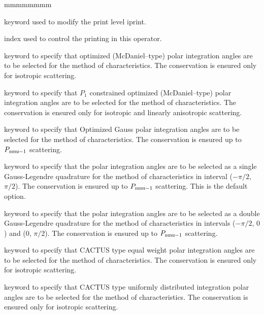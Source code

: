 \begin{ListeDeDescription}{mmmmmmmm}

\item[\moc{EDIT}] keyword used to modify the print level iprint.

\item[\dusa{iprint}] index used to control the printing in this operator.

\item[\moc{LCMD}] keyword to specify that optimized (McDaniel--type) polar integration angles are to be
selected for the method of characteristics.\cite{LCMD} The conservation is ensured only for isotropic scattering.

\item[\moc{OPP1}] keyword to specify that $P_1$ constrained optimized (McDaniel--type) polar integration angles are to be selected for the method of characteristics.\cite{LeTellierpa} The conservation is ensured only for isotropic and linearly anisotropic scattering.

\item[\moc{OGAU}] keyword to specify that Optimized Gauss polar integration angles are to be
selected for the method of characteristics.\cite{LCMD,LeTellierpa} The conservation is ensured up to $P_{\dusa{nmu}-1}$ scattering.

\item[\moc{GAUS}] keyword to specify that the polar integration angles are to be selected as a single Gauss-Legendre quadrature for the method of characteristics in interval ($-\pi/2$, $\pi/2$). The conservation is ensured up to $P_{\dusa{nmu}-1}$ scattering. This is the default option.

\item[\moc{DGAU}] keyword to specify that the polar integration angles are to be selected as a double Gauss-Legendre quadrature for the method of characteristics in intervals ($-\pi/2$, $0$) and ($0$, $\pi/2$). The conservation is ensured up to $P_{\dusa{nmu}-1}$ scattering.

\item[\moc{CACA}] keyword to specify that CACTUS type equal weight polar integration angles are to be
selected for the method of characteristics.\cite{CACTUS} The conservation is ensured only for isotropic scattering.

\item[\moc{CACB}] keyword to specify that CACTUS type uniformly distributed integration polar angles
are to be selected for the method of characteristics.\cite{CACTUS} The conservation is ensured only for isotropic scattering.


\end{ListeDeDescription}
